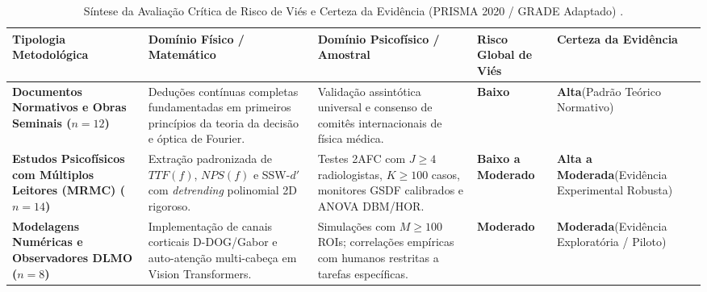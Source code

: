 \documentclass[
  12pt,
  a4paper,
  oneside
]{report}
\begin{document}
\begin{table}[htbp]
  \centering
  \small
  \caption[Avaliação de Risco de Viés e Certeza da Evidência do Corpus]{Síntese da Avaliação Crítica de Risco de Viés e Certeza da Evidência (PRISMA 2020 / GRADE Adaptado) \cite{page2021, aapm_tg233_2019, icru54_1996, dorfman1992, fitton2026, aapm_report204}.}
  \label{tab:avaliacao_risco_vies_corpus}
  \renewcommand{\arraystretch}{1.30}
  \begin{tabularx}{\textwidth}{>{\RaggedRight\bfseries}p{} >{\RaggedRight}p{} >{\RaggedRight}p{} >{\centering\arraybackslash}p{} >{\RaggedRight\arraybackslash}X}
    \toprule
    \textbf{Tipologia Metodológica} & \textbf{Domínio Físico / Matemático} & \textbf{Domínio Psicofísico / Amostral} & \textbf{Risco Global de Viés} & \textbf{Certeza da Evidência} \\
    \midrule
    Documentos Normativos e Obras Seminais ($n = 12$) \cite{aapm_tg233_2019, icru54_1996, icrp103_2007, anvisa_rdc611_2022, barrett_myers_2004, wagner1979, burgess1994, metz1986, aapm_report204} &
    Deduções contínuas completas fundamentadas em primeiros princípios da teoria da decisão e óptica de Fourier. &
    Validação assintótica universal e consenso de comitês internacionais de física médica. &
    \textbf{Baixo} &
    \textbf{Alta}\newline (Padrão Teórico Normativo) \\
    \addlinespace[0.5em]
    Estudos Psicofísicos com Múltiplos Leitores (MRMC) ($n = 14$) \cite{racine2020, racine2021, solomon2020, greffier2026, pimenta2026, toia2023, debbiche2024, fitton2026, goppel2021} &
    Extração padronizada de $TTF(f)$, $NPS(f)$ e SSW-$d'$ com \emph{detrending} polinomial 2D rigoroso. &
    Testes 2AFC com $J \ge 4$ radiologistas, $K \ge 100$ casos, monitores GSDF calibrados e ANOVA DBM/HOR. &
    \textbf{Baixo a Moderado} &
    \textbf{Alta a Moderada}\newline (Evidência Experimental Robusta) \\
    \addlinespace[0.5em]
    Modelagens Numéricas e Observadores DLMO ($n = 8$) \cite{vaswani2017, dosovitskiy2020, toia2023, debbiche2024, myers_barrett_1987, gallas2003} &
    Implementação de canais corticais D-DOG/Gabor e auto-atenção multi-cabeça em Vision Transformers. &
    Simulações com $M \ge 100$ ROIs; correlações empíricas com humanos restritas a tarefas específicas. &
    \textbf{Moderado} &
    \textbf{Moderada}\newline (Evidência Exploratória / Piloto) \\

\end{tabularx}
\end{table}
\end{document}

